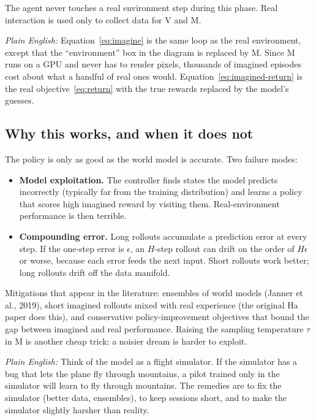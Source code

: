 \documentclass[11pt]{article}
\theoremstyle{remark}
\newcommand{\plain}[1]{\medskip\noindent\textit{Plain English:} #1\medskip}
\begin{document}
The agent never touches a real environment step during this phase. Real interaction is used only to collect data for V and M.

\plain{Equation~\eqref{eq:imagine} is the same loop as the real environment, except that the ``environment'' box in the diagram is replaced by M. Since M runs on a GPU and never has to render pixels, thousands of imagined episodes cost about what a handful of real ones would. Equation~\eqref{eq:imagined-return} is the real objective~\eqref{eq:return} with the true rewards replaced by the model's guesses.}

\subsection{Why this works, and when it does not}

The policy is only as good as the world model is accurate. Two failure modes:

\begin{itemize}[leftmargin=1.4em]
  \item \textbf{Model exploitation.} The controller finds states the model predicts incorrectly (typically far from the training distribution) and learns a policy that scores high imagined reward by visiting them. Real-environment performance is then terrible.
  \item \textbf{Compounding error.} Long rollouts accumulate a prediction error at every step. If the one-step error is $\epsilon$, an $H$-step rollout can drift on the order of $H\epsilon$ or worse, because each error feeds the next input. Short rollouts work better; long rollouts drift off the data manifold.
\end{itemize}

Mitigations that appear in the literature: ensembles of world models (Janner et al., 2019), short imagined rollouts mixed with real experience (the original Ha paper does this), and conservative policy-improvement objectives that bound the gap between imagined and real performance. Raising the sampling temperature $\tau$ in M is another cheap trick: a noisier dream is harder to exploit.

\plain{Think of the model as a flight simulator. If the simulator has a bug that lets the plane fly through mountains, a pilot trained only in the simulator will learn to fly through mountains. The remedies are to fix the simulator (better data, ensembles), to keep sessions short, and to make the simulator slightly harsher than reality.}
\end{document}
